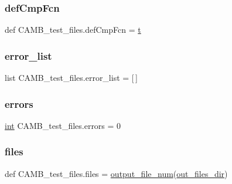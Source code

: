 \subsubsection{\texorpdfstring{def\+Cmp\+Fcn}{defCmpFcn}}
{\footnotesize\ttfamily def C\+A\+M\+B\+\_\+test\+\_\+files.\+def\+Cmp\+Fcn = \mbox{\hyperlink{plotcls_8m_aaccc9105df5383111407fd5b41255e23}{t}}}

\mbox{\label{namespaceCAMB__test__files_aed3a631344121c3680babbd847dd4277}} 
\subsubsection{\texorpdfstring{error\+\_\+list}{error\_list}}
{\footnotesize\ttfamily list C\+A\+M\+B\+\_\+test\+\_\+files.\+error\+\_\+list = \mbox{[}$\,$\mbox{]}}

\mbox{\label{namespaceCAMB__test__files_aed6dfae5d7772aeb01bdf0bc6ea2aff9}} 
\subsubsection{\texorpdfstring{errors}{errors}}
{\footnotesize\ttfamily \mbox{\hyperlink{namespaceCAMB__test__files_ae3f939a649209ec8d0004b0dfef3210b}{int}} C\+A\+M\+B\+\_\+test\+\_\+files.\+errors = 0}

\mbox{\label{namespaceCAMB__test__files_a830af4ed561145655ecc4f63423fd5b1}} 
\subsubsection{\texorpdfstring{files}{files}}
{\footnotesize\ttfamily def C\+A\+M\+B\+\_\+test\+\_\+files.\+files = \mbox{\hyperlink{namespaceCAMB__test__files_a2aa5d4f5677cf5a78388238c4dc45b7d}{output\+\_\+file\+\_\+num}}(\mbox{\hyperlink{namespaceCAMB__test__files_aab425eab53a3ec49aec1a01880b7bad7}{out\+\_\+files\+\_\+dir}})}

